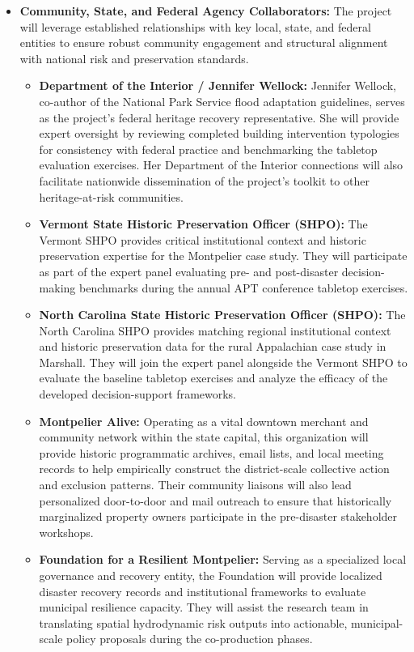 \documentclass[11pt]{article}
\begin{document}
\begin{itemize}
\item \textbf{Community, State, and Federal Agency Collaborators:} 
The project will leverage established relationships with key local, state, and federal entities to ensure robust community engagement and structural alignment with national risk and preservation standards. 
\begin{itemize}
    \item \textbf{Department of the Interior / Jennifer Wellock:} Jennifer Wellock, co-author of the National Park Service flood adaptation guidelines, serves as the project's federal heritage recovery representative. She will provide expert oversight by reviewing completed building intervention typologies for consistency with federal practice and benchmarking the tabletop evaluation exercises. Her Department of the Interior connections will also facilitate nationwide dissemination of the project's toolkit to other heritage-at-risk communities.
    \item \textbf{Vermont State Historic Preservation Officer (SHPO):} The Vermont SHPO provides critical institutional context and historic preservation expertise for the Montpelier case study. They will participate as part of the expert panel evaluating pre- and post-disaster decision-making benchmarks during the annual APT conference tabletop exercises.
    \item \textbf{North Carolina State Historic Preservation Officer (SHPO):} The North Carolina SHPO provides matching regional institutional context and historic preservation data for the rural Appalachian case study in Marshall. They will join the expert panel alongside the Vermont SHPO to evaluate the baseline tabletop exercises and analyze the efficacy of the developed decision-support frameworks.
    \item \textbf{Montpelier Alive:} Operating as a vital downtown merchant and community network within the state capital, this organization will provide historic programmatic archives, email lists, and local meeting records to help empirically construct the district-scale collective action and exclusion patterns. Their community liaisons will also lead personalized door-to-door and mail outreach to ensure that historically marginalized property owners participate in the pre-disaster stakeholder workshops.
    \item \textbf{Foundation for a Resilient Montpelier:} Serving as a specialized local governance and recovery entity, the Foundation will provide localized disaster recovery records and institutional frameworks to evaluate municipal resilience capacity. They will assist the research team in translating spatial hydrodynamic risk outputs into actionable, municipal-scale policy proposals during the co-production phases.

\end{itemize}
\end{itemize}
\end{document}
